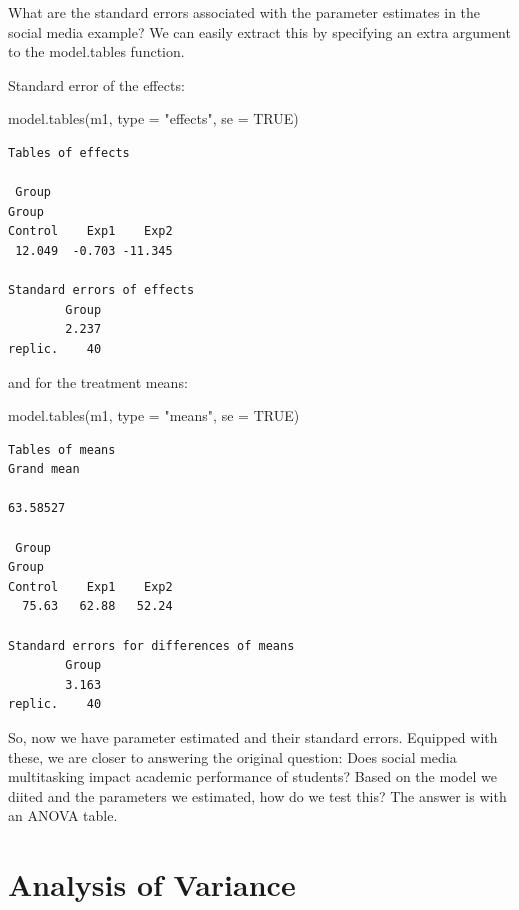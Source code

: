 \documentclass[
  letterpaper,
  DIV=11,
  numbers=noendperiod,
  oneside]{scrreprt}
\newenvironment{Shaded}{\begin{snugshade}}{\end{snugshade}}
\newcommand{\AttributeTok}[1]{\textcolor[rgb]{0.40,0.45,0.13}{#1}}
\newcommand{\ConstantTok}[1]{\textcolor[rgb]{0.56,0.35,0.01}{#1}}
\newcommand{\FunctionTok}[1]{\textcolor[rgb]{0.28,0.35,0.67}{#1}}
\newcommand{\NormalTok}[1]{\textcolor[rgb]{0.00,0.23,0.31}{#1}}
\newcommand{\StringTok}[1]{\textcolor[rgb]{0.13,0.47,0.30}{#1}}
\begin{document}
What are the standard errors associated with the parameter estimates in
the social media example? We can easily extract this by specifying an
extra argument to the model.tables function.

Standard error of the effects:

\begin{Shaded}
\begin{Highlighting}[]
\FunctionTok{model.tables}\NormalTok{(m1, }\AttributeTok{type =} \StringTok{"effects"}\NormalTok{, }\AttributeTok{se =} \ConstantTok{TRUE}\NormalTok{)}
\end{Highlighting}
\end{Shaded}

\begin{verbatim}
Tables of effects

 Group 
Group
Control    Exp1    Exp2 
 12.049  -0.703 -11.345 

Standard errors of effects
        Group
        2.237
replic.    40
\end{verbatim}

and for the treatment means:

\begin{Shaded}
\begin{Highlighting}[]
\FunctionTok{model.tables}\NormalTok{(m1, }\AttributeTok{type =} \StringTok{"means"}\NormalTok{, }\AttributeTok{se =} \ConstantTok{TRUE}\NormalTok{)}
\end{Highlighting}
\end{Shaded}

\begin{verbatim}
Tables of means
Grand mean
         
63.58527 

 Group 
Group
Control    Exp1    Exp2 
  75.63   62.88   52.24 

Standard errors for differences of means
        Group
        3.163
replic.    40
\end{verbatim}

So, now we have parameter estimated and their standard errors. Equipped
with these, we are closer to answering the original question: Does
social media multitasking impact academic performance of students? Based
on the model we diited and the parameters we estimated, how do we test
this? The answer is with an ANOVA table.

\chapter{Analysis of Variance}\label{analysis-of-variance}
\end{document}
